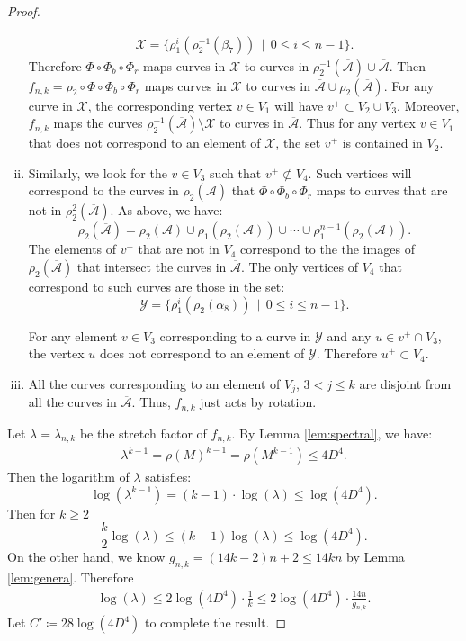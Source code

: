 \begin{proof}
\begin{enumerate}[(i)]
\begin{align*}
    \mathcal{X} = \{ \rho_1^i(\rho_2^{-1}(\beta_7))\,\mid\,0\leq i\leq n-1\}.
  \end{align*}
  Therefore $\Phi\circ\Phi_b\circ\Phi_r$ maps curves in $\mathcal{X}$ to curves in $\rho_2^{-1}(\overline{\mathcal{A}})\cup\overline{\mathcal{A}}$.  Then $f_{n,k}=\rho_2\circ\Phi\circ\Phi_b\circ\Phi_r$ maps curves in $\mathcal{X}$ to curves in $\overline{\mathcal{A}}\cup\rho_2(\overline{\mathcal{A}}).$
For any curve in $\mathcal{X}$, the corresponding vertex $v\in V_1$ will have
  $v^+ \subset V_2 \cup V_3.$  Moreover, $f_{n,k}$ maps the curves $\rho_2^{-1}(\overline{\mathcal{A}})\setminus \mathcal{X}$ to curves in $\overline{\mathcal{A}}$.  Thus for any vertex $v\in V_1$ that does not correspond to an element of $\mathcal{X}$, the set $v^+$ is contained in $V_2$.
\item  Similarly, we look for the $v \in V_3$ such that $v^+ \not\subset V_4$.  Such vertices will correspond to the curves in $\rho_2(\overline{\mathcal{A}})$ that $\Phi\circ\Phi_b\circ\Phi_r$ maps to curves that are not in $\rho_2^2(\overline{\mathcal{A}})$.  As above, we have: $$\rho_2(\overline{\mathcal{A}})=\rho_2(\mathcal{A})\cup\rho_1(\rho_2(\mathcal{A}))\cup\cdots\cup\rho_1^{n-1}(\rho_2(\mathcal{A})).$$
The elements of $v^+$ that are not in $V_4$ correspond to the the images of $\rho_2(\overline{\mathcal{A}})$ that intersect the curves in $\overline{\mathcal{A}}$.
The only vertices of $V_4$ that correspond to such curves are those in the set:
 $$\mathcal{Y}=\{\rho_1^i(\rho_2(\alpha_8))\,\mid\,0\leq i\leq n-1\}.$$ %



  For any element $v \in V_3$ corresponding to a curve in $\mathcal{Y}$ and any
  $u \in v^+ \cap V_3$, the vertex $u$ does not correspond to an element of $\mathcal{Y}$.  Therefore $u^+ \subset V_4$.
\item All the curves corresponding to an element of $V_j$, $3 < j \leq k$ are disjoint from all the curves in
  $\overline{\mathcal{A}}$. Thus, $f_{n,k}$ just acts by rotation.
\end{enumerate}

Let $\lambda = \lambda_{n,k}$ be the stretch factor of $f_{n,k}$.  By Lemma \ref{lem:spectral}, we have:
\begin{gather*}
    \lambda^{k-1} = \rho(M)^{k-1} = \rho(M^{k-1}) \leq 4D^4.
\end{gather*}
Then the logarithm of $\lambda$ satisfies:
$$\log(\lambda^{k-1})=(k-1)\cdot \log(\lambda) \leq \log(4D^4).$$
Then for $k\geq 2$
    $$\frac{k}{2}\log(\lambda) \leq (k-1)\log(\lambda) \leq \log(4D^4).$$
On the other hand, we know $g_{n,k} = (14k - 2)n + 2 \leq 14kn$ by Lemma \ref{lem:genera}. Therefore
\begin{align*}
    \log(\lambda) \leq 2\log(4D^4)\cdot\frac{1}{k} \leq 2\log(4D^4)\cdot \frac{14n}{g_{n,k}}.
\end{align*}
Let $C' \coloneqq 28\log(4D^4)$ to complete the result.
\end{proof}

